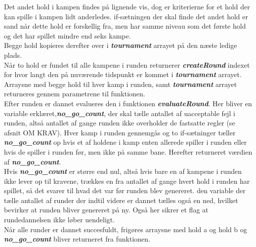 Det andet hold i kampen findes på lignende vis, dog er kriterierne for et hold der kan spille i kampen lidt anderledes. if-sætningen der skal finde det andet hold er sand når dette hold er forskellig fra, men har samme niveau som det første hold og det har spillet mindre end seks kampe.\\
Begge hold kopieres derefter over i \textbf{\textit{tournament}} arrayet på den næste ledige plads. \\
Når to hold er fundet til alle kampene i runden returnerer \textbf{\textit{createRound}} indexet for hvor langt den på nuværende tidspunkt er kommet i \textbf{\textit{tournament}} arrayet. Arraysne med begge hold til hver kamp i runden, samt \textbf{\textit{tournament}} arrayet returneres gennem parametrene til funktionen. \\
Efter runden er dannet evalueres den i funktionen \textbf{\textit{evaluateRound}}. Her bliver en variable erklæret,\textbf{\textit{no\_go\_count}}, der skal tælle antallet af uacceptable fejl i runden, altså antallet af gange runden ikke overholder de fastsatte regler (se afsnit OM KRAV). Hver kamp i runden gennemgås og to if-sætninger tæller \textbf{\textit{no\_go\_count}} op hvis et af holdene i kamp enten allerede spiller i runden eller hvis de spiller i runden før, men ikke på samme bane. Herefter returneret værdien af \textbf{\textit{no\_go\_count}}. \\
Hvis \textbf{\textit{no\_go\_count}} er større end nul, altså hvis bare en af kampene i runden ikke lever op til kravene, trækkes en fra antallet af gange hvert hold i runden har spillet, så det svarer til hvad det var før runden blev genereret. den variable der tælle antallet af runder der indtil videre er dannet tælles også en ned, hvilket bevirker at runden bliver genereret på ny. Også her sikrer et flag at rundedannelsen ikke løber uendeligt. \\
Når alle runder er dannet succesfuldt, frigøres arraysne med hold a og hold b og \textbf{\textit{no\_go\_count}} bliver returneret fra funktionen. 

